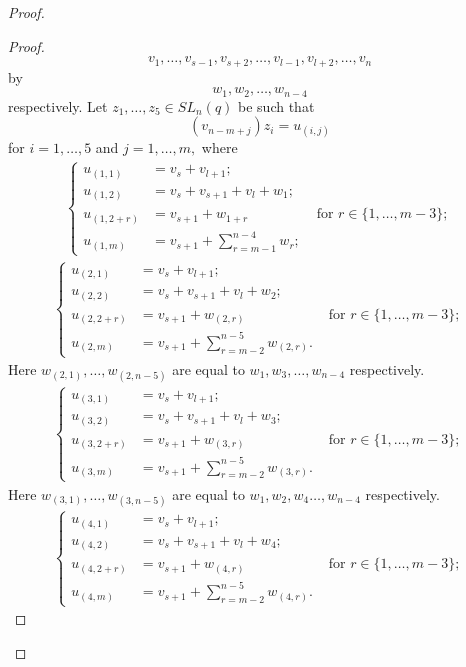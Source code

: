 \begin{proof}
\begin{proof}
$$v_1, \ldots, v_{s-1}, v_{s+2}, \ldots, v_{l-1}, v_{l+2}, \ldots, v_{n}$$ by $$w_1, w_2, \ldots, w_{n-4}$$ respectively.
Let $z_1, \ldots, z_5 \in SL_n(q)$ be such that $$(v_{n-m+j})z_i=u_{(i,j)}$$ for $i=1, \ldots, 5$ and $j=1, \ldots, m,$ where
\begin{gather}\label{orb2t1}
\left\{ 
\begin{aligned}
u_{(1,1)} & = v_{s} + v_{l+1};\\
u_{(1,2)} & = v_{s}+ v_{s+1}+v_{l}+w_1;\\
u_{(1,2+r)} & =v_{s+1}+w_{1+r}\phantom{;} &\text{ for } r \in \{1, \ldots, m-3\};\\
u_{(1,m)} & =v_{s+1}+\sum_{r=m-1}^{n-4}w_r;
\end{aligned}
\right.
\end{gather}
\begin{gather}%
\left\{ 
\begin{aligned}
u_{(2,1)} & = v_{s} + v_{l+1};\\
u_{(2,2)} & = v_{s}+v_{s+1}+v_{l}+w_2;\\
u_{(2,2+r)} & =v_{s+1}+w_{(2,r)}\phantom{;} &\text{ for } r \in \{1, \ldots, m-3\};\\
u_{(2,m)} & =v_{s+1}+\sum_{r=m-2}^{n-5}w_{(2,r)}.
\end{aligned}
\right. 
\end{gather}
Here $w_{(2,1)}, \ldots, w_{(2,n-5)}$ are equal to $w_1, w_3, \ldots, w_{n-4}$ respectively.  
\begin{gather}
\left\{ 
\begin{aligned}
u_{(3,1)} & = v_{s} + v_{l+1};\\
u_{(3,2)} & = v_{s}+ v_{s+1}+v_{l}+w_3;\\
u_{(3,2+r)} & =v_{s+1}+w_{(3,r)}\phantom{;} &\text{ for } r \in \{1, \ldots, m-3\};\\
u_{(3,m)} & =v_{s+1}+\sum_{r=m-2}^{n-5}w_{(3,r)}.
\end{aligned}
\right.
\end{gather} 
Here $w_{(3,1)}, \ldots, w_{(3,n-5)}$ are equal to $w_1, w_2, w_4 \ldots, w_{n-4}$ respectively.  
\begin{gather} 
\left\{ 
\begin{aligned}%
u_{(4,1)} & = v_{s} + v_{l+1};\\
u_{(4,2)} & = v_{s}+ v_{s+1}+v_{l}+w_4;\\
u_{(4,2+r)} & =v_{s+1}+w_{(4,r)}\phantom{;} &\text{ for } r \in \{1, \ldots, m-3\};\\
u_{(4,m)} & =v_{s+1}+\sum_{r=m-2}^{n-5}w_{(4,r)}.

\end{aligned}
\end{gather}
\end{proof}
\end{proof}
